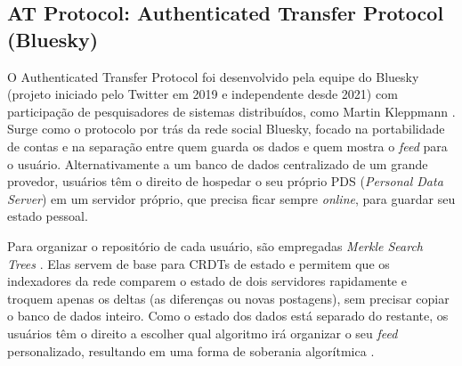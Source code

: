 \subsection{AT Protocol: Authenticated Transfer Protocol (Bluesky)}

O Authenticated Transfer Protocol foi desenvolvido pela equipe do Bluesky (projeto iniciado pelo Twitter em 2019 e independente desde 2021) com participação de pesquisadores de sistemas distribuídos, como Martin Kleppmann \cite{kleppmann2024bluesky}.
Surge como o protocolo por trás da rede social Bluesky, focado na portabilidade de contas e na separação entre quem guarda os dados e quem mostra o \textit{feed} para o usuário. Alternativamente a um
banco de dados centralizado de um grande provedor, usuários têm o direito de hospedar o seu próprio PDS (\textit{Personal Data Server}) em um servidor próprio, que precisa ficar sempre \textit{online}, para guardar seu estado pessoal.

Para organizar o repositório de cada usuário, são empregadas \textit{Merkle Search Trees} \cite{auvolattaiani2019}. Elas servem de base para CRDTs de estado e permitem que os indexadores da
rede comparem o estado de dois servidores rapidamente e troquem apenas os deltas (as diferenças ou novas postagens), sem precisar copiar o banco de dados inteiro.
Como o estado dos dados está separado do restante, os usuários têm o direito a escolher qual algoritmo irá organizar o seu \textit{feed} personalizado, resultando em uma forma
de soberania algorítmica \cite{kleppmann2024bluesky}.
